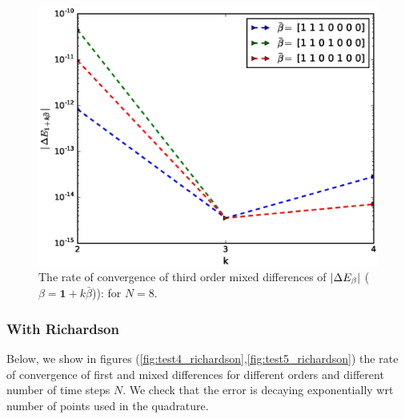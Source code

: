 \documentclass[11pt]{article}
\begin{document}
\begin{figure}[!h]
	\centering
	\includegraphics[width=0.6\linewidth]{./figures/mixed_difference_order3_1D_BS_N_8.eps}
	
	\caption{The rate of convergence of  third order mixed differences of  $\left\lvert\Delta E_{\beta}\right\rvert$ ($\beta=\mathbf{1}+k \bar{\beta}$)): for  $N=8$.}
	\label{fig:test6}
\end{figure}
\newpage
\subsubsection*{With Richardson}


Below, we show in figures (\eqref{fig:test4_richardson},\eqref{fig:test5_richardson}) the rate of convergence of first and mixed differences for different orders and different number of time steps $N$. We check that the error is decaying exponentially wrt number of points used in the quadrature.
\end{document}
